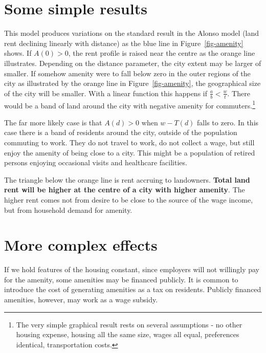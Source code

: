 \section{Some simple results}
 This model produces  variations on the standard result in the Alonso model (land rent declining linearly with distance) as the blue line in Figure~\ref{fig-amenity} shows.  If $A(0)>0$, the rent profile is raised near the centre as the  orange line illustrates. Depending on the distance parameter, the city extent may be larger of smaller.  If somehow amenity were to fall below zero in the outer regions of the city as illustrated by the orange line  in Figure~\ref{fig-amenity}, the geographical size of the  city will be smaller. With a linear function this happens if $\frac{a}{b} < \frac{w}{t}$. There would be a band of land around the city with negative amenity for commuters.\footnote{The very simple graphical result rests on several assumptions - no other housing expense, housing all the same size, wages all equal, preferences identical, transportation costs.}

The far more likely case is that $A(d) > 0$ when $w-T(d)$ falls to zero. In this case there is a band of  residents around the city, outside of the population commuting to work. They do not travel to work,  do not collect a wage, but still enjoy the amenity of being close to a city. This might be a population of retired persons enjoying occasional visits and healthcare facilities.

The triangle below the orange line is rent accruing to landowners. \textbf{Total land rent will be higher at the centre of a city with higher amenity}. The  higher rent comes not from desire to be close to the source of the wage income, but from household demand for amenity.  

\section{More complex effects}

If we hold features of the housing constant,
since employers will not willingly pay for the amenity, some amenities may be financed publicly. It is common to introduce the cost of generating amenities as a tax on residents. Publicly financed amenities, however, may work as a wage subsidy.  
   







